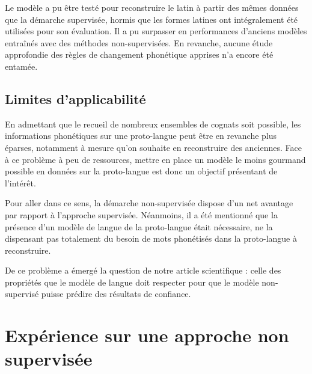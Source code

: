 \documentclass[12pt, french, twoside]{report}
\begin{document}
\vspace{12pt}
Le modèle a pu être testé pour reconstruire le latin à partir des mêmes données que la démarche supervisée, hormis que les formes latines ont intégralement été utilisées pour son évaluation. Il a pu surpasser en performances d'anciens modèles entraînés avec des méthodes non-supervisées. En revanche, aucune étude approfondie des règles de changement phonétique apprises n'a encore été entamée. \cite[7]{he2022neural}


\subsection{Limites d'applicabilité}
En admettant que le recueil de nombreux ensembles de cognats soit possible, les informations phonétiques sur une proto-langue peut être en revanche plus éparses, notamment à mesure qu'on souhaite en reconstruire des anciennes. Face à ce problème à peu de ressources, mettre en place un modèle le moins gourmand possible en données sur la proto-langue est donc un objectif présentant de l'intérêt.

Pour aller dans ce sens, la démarche non-supervisée dispose d'un net avantage par rapport à l'approche supervisée. Néanmoins, il a été mentionné que la présence d'un modèle de langue de la proto-langue était nécessaire, ne la dispensant pas totalement du besoin de mots phonétisés dans la proto-langue à reconstruire.

De ce problème a émergé la question de notre article scientifique : celle des propriétés que le modèle de langue doit respecter pour que le modèle non-supervisé puisse prédire des résultats de confiance.

\section{Expérience sur une approche non supervisée}
\end{document}
